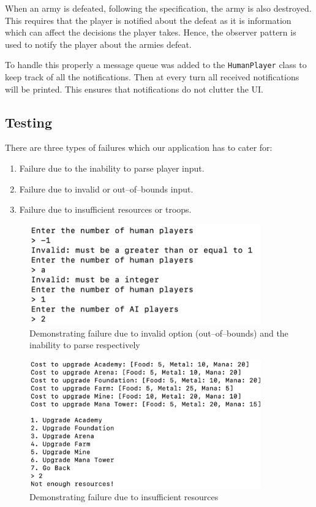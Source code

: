 \documentclass[12pt]{article}
\begin{document}
When an army is defeated, following the specification, the army
is also destroyed. This requires that the player is notified
about the defeat as it is information which can affect the
decisions the player takes. Hence, the observer pattern is used
to notify the player about the armies defeat.

To handle this properly a message queue was added to the
\texttt{HumanPlayer} class to keep track of all the
notifications. Then at every turn all received notifications
will be printed. This ensures that notifications do not clutter
the UI.

\subsection{Testing}

There are three types of failures which our application has
to cater for:

\begin{enumerate}
    \item Failure due to the inability to parse player input.
    \item Failure due to invalid or out--of--bounds input.
    \item Failure due to insufficient resources or troops.
\end{enumerate}

\begin{figure}[H]
    \centering
    \includegraphics[width=10cm]{./images/invalid-user-input-village-war-game.png}
    \caption{Demonstrating failure due to invalid option
    (out--of--bounds) and the inability to parse respectively}
\end{figure}

\begin{figure}[H]
    \centering
    \includegraphics[width=10cm]{./images/not-enough-resources-village-war-game.png}
    \caption{Demonstrating failure due to insufficient
    resources}
\end{figure}
\end{document}
